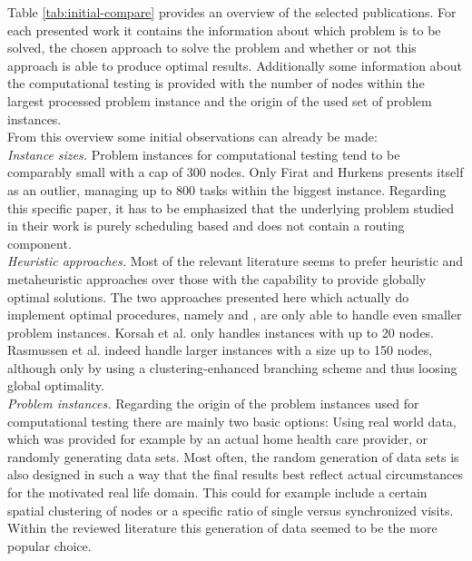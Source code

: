 %

%
Table \ref{tab:initial-compare} provides an overview of the selected publications. For each presented work it contains the information about which problem is to be solved, the chosen approach to solve the problem and whether or not this approach is able to produce optimal results. Additionally some information about the computational testing is provided with the number of nodes within the largest processed problem instance and the origin of the used set of problem instances.\\
From this overview some initial observations can already be made:\\
\textit{Instance sizes.} Problem instances for computational testing tend to be comparably small with a cap of 300 nodes. Only Firat and Hurkens \cite{firatImprovedMIPbasedApproach2012} presents itself as an outlier, managing up to 800 tasks within the biggest instance. Regarding this specific paper, it has to be emphasized that the underlying problem studied in their work is purely scheduling based and does not contain a routing component.\\
\textit{Heuristic approaches.} Most of the relevant literature seems to prefer heuristic and metaheuristic approaches over those with the capability to provide globally optimal solutions. The two approaches presented here which actually do implement optimal procedures, namely \cite{korsahOptimalVehicleRouting2010} and \cite{rasmussenHomeCareCrew2012}, are only able to handle even smaller problem instances. Korsah et al. \cite{korsahOptimalVehicleRouting2010} only handles instances with up to 20 nodes. Rasmussen et al. \cite{rasmussenHomeCareCrew2012} indeed handle larger instances with a size up to 150 nodes, although only by using a clustering-enhanced branching scheme and thus loosing global optimality.\\
\textit{Problem instances.} Regarding the origin of the problem instances used for computational testing there are mainly two basic options: Using real world data, which was provided for example by an actual home health care provider, or randomly generating data sets. Most often, the random generation of data sets is also designed in such a way that the final results best reflect actual circumstances for the motivated real life domain. This could for example include a certain spatial clustering of nodes or a specific ratio of single versus synchronized visits. Within the reviewed literature this generation of data seemed to be the more popular choice.\\
